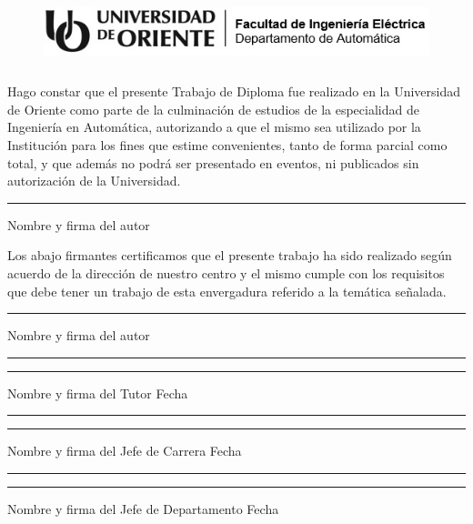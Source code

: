 \thispagestyle{empty}

\begin{figure}[h]
    \centering
    \includegraphics[width=15cm, height=2cm]{imagenes/identidad en blanco y negro.jpg}
\end{figure}

\vspace{0.5cm}

Hago constar que el presente Trabajo de Diploma fue realizado en la Universidad de Oriente como parte de la culminación de estudios de la especialidad de Ingeniería en Automática, autorizando a que el mismo sea utilizado por la Institución para los fines que estime convenientes, tanto de forma parcial como total, y que además no podrá ser presentado en eventos, ni publicados sin autorización de la Universidad.\\

\begin{center}
    \rule{11cm}{1pt}
    \newline
    Nombre y firma del autor\\
\end{center}

Los abajo firmantes certificamos que el presente trabajo ha sido realizado según acuerdo de la dirección de nuestro centro y el mismo cumple con los requisitos que debe tener un trabajo de esta envergadura referido a la temática señalada.\\

\begin{center}
    \rule{11cm}{1pt}
    \newline
    Nombre y firma del autor\\
\end{center}

\vspace{1.5cm}

\rule{8cm}{1pt}
\hspace{4.3cm}
\rule{3cm}{1pt}

\hspace{1.8cm}
Nombre y firma del Tutor
\hspace{7cm}
Fecha

\vspace{1cm}

\rule{8cm}{1pt}
\hspace{4.3cm}
\rule{3cm}{1pt}

\hspace{0.7cm}
Nombre y firma del Jefe de Carrera
\hspace{6.2cm}
Fecha

\vspace{1cm}

\rule{8cm}{1pt}
\hspace{4.3cm}
\rule{3cm}{1pt}

\hspace{0.2cm}
Nombre y firma del Jefe de Departamento
\hspace{5.5cm}
Fecha

